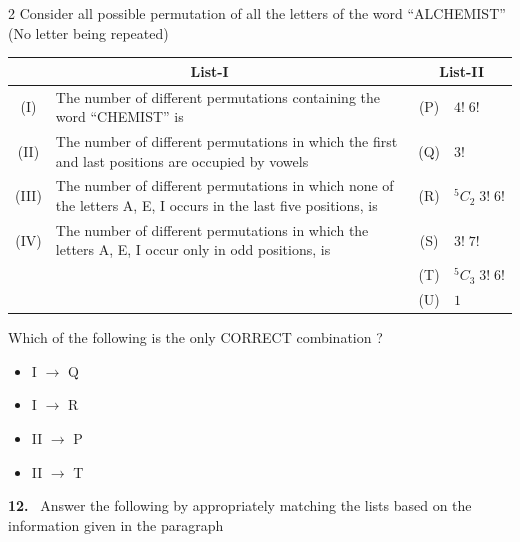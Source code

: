 \documentclass[10pt]{extarticle}
\newcommand{\qn}[1]{\par\smallskip\noindent\textbf{#1.}~}
\newenvironment{qoptions}{\begin{itemize}[leftmargin=1.8em,itemsep=1pt,topsep=2pt,label={}]}{\end{itemize}}
\newcommand{\opt}[2]{\item[(#1)] #2}
\begin{document}
\begin{multicols}{2}
Consider all possible permutation of all the letters of the word ``ALCHEMIST'' (No letter being repeated)
\begin{center}\small\setlength{\tabcolsep}{3pt}
\begin{tabular}{|c|p{3.7cm}|c|p{2.3cm}|}
\hline
\multicolumn{2}{|c|}{List-I} & \multicolumn{2}{c|}{List-II}\\ \hline
(I) & The number of different permutations containing the word ``CHEMIST'' is & (P) & $4!\;6!$\\ \hline
(II) & The number of different permutations in which the first and last positions are occupied by vowels & (Q) & $3!$\\ \hline
(III) & The number of different permutations in which none of the letters A, E, I occurs in the last five positions, is & (R) & $^5C_2\;3!\;6!$\\ \hline
(IV) & The number of different permutations in which the letters A, E, I occur only in odd positions, is & (S) & $3!\;7!$\\ \hline
 & & (T) & $^5C_3\;3!\;6!$\\ \hline
 & & (U) & $1$\\ \hline
\end{tabular}
\end{center}
Which of the following is the only CORRECT combination ?
\begin{qoptions}
\opt{A}{I $\to$ Q}
\opt{B}{I $\to$ R}
\opt{C}{II $\to$ P}
\opt{D}{II $\to$ T}
\end{qoptions}
\qn{12} Answer the following by appropriately matching the lists based on the information given in the paragraph


\end{multicols}
\end{document}
